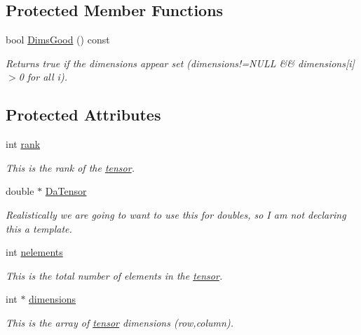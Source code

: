 \subsection*{Protected Member Functions}
\begin{DoxyCompactItemize}
\item 
bool \hyperlink{classJKBuilder_1_1tensor_a6e72344440b411f433eb50171648c2d0}{DimsGood} () const 
\begin{DoxyCompactList}\small\item\em Returns true if the dimensions appear set (dimensions!=NULL \&\& dimensions\mbox{[}i\mbox{]}$>$0 for all i). \item\end{DoxyCompactList}\end{DoxyCompactItemize}
\subsection*{Protected Attributes}
\begin{DoxyCompactItemize}
\item 
int \hyperlink{classJKBuilder_1_1tensor_a6cfd95afd0afebd625b889fb6e58371c}{rank}
\begin{DoxyCompactList}\small\item\em This is the rank of the \hyperlink{classJKBuilder_1_1tensor}{tensor}. \item\end{DoxyCompactList}\item 
double $\ast$ \hyperlink{classJKBuilder_1_1tensor_a91f7b1e58c0e5d1a49ddb8b80ab7790e}{DaTensor}
\begin{DoxyCompactList}\small\item\em Realistically we are going to want to use this for doubles, so I am not declaring this a template. \item\end{DoxyCompactList}\item 
int \hyperlink{classJKBuilder_1_1tensor_a23ae6a00bed19d2ad34d439636e797da}{nelements}
\begin{DoxyCompactList}\small\item\em This is the total number of elements in the \hyperlink{classJKBuilder_1_1tensor}{tensor}. \item\end{DoxyCompactList}\item 
int $\ast$ \hyperlink{classJKBuilder_1_1tensor_a2ce1e6e0782ddee097f2c4aa2663d3e9}{dimensions}
\begin{DoxyCompactList}\small\item\em This is the array of \hyperlink{classJKBuilder_1_1tensor}{tensor} dimensions (row,column). \item\end{DoxyCompactList}\end{DoxyCompactItemize}

